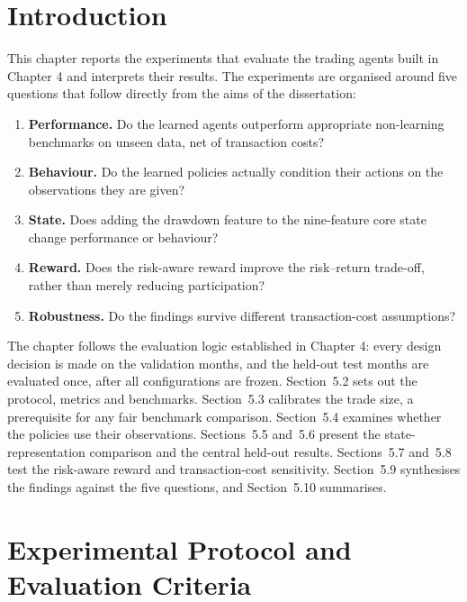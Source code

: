 
\section{Introduction}

This chapter reports the experiments that evaluate the trading agents built
in Chapter 4 and interprets their results. The experiments are organised
around five questions that follow directly from the aims of the
dissertation:

\begin{enumerate}
  \item \textbf{Performance.} Do the learned agents outperform appropriate
        non-learning benchmarks on unseen data, net of transaction costs?
  \item \textbf{Behaviour.} Do the learned policies actually condition their
        actions on the observations they are given?
  \item \textbf{State.} Does adding the drawdown feature to the nine-feature
        core state change performance or behaviour?
  \item \textbf{Reward.} Does the risk-aware reward improve the risk--return
        trade-off, rather than merely reducing participation?
  \item \textbf{Robustness.} Do the findings survive different
        transaction-cost assumptions?
\end{enumerate}

The chapter follows the evaluation logic established in Chapter 4: every
design decision is made on the validation months, and the held-out test
months are evaluated once, after all configurations are frozen.
Section~5.2 sets out the protocol, metrics and benchmarks. Section~5.3
calibrates the trade size, a prerequisite for any fair benchmark comparison.
Section~5.4 examines whether the policies use their observations.
Sections~5.5 and~5.6 present the state-representation comparison and the
central held-out results. Sections~5.7 and~5.8 test the risk-aware reward
and transaction-cost sensitivity. Section~5.9 synthesises the findings
against the five questions, and Section~5.10 summarises.

\section{Experimental Protocol and Evaluation Criteria}

